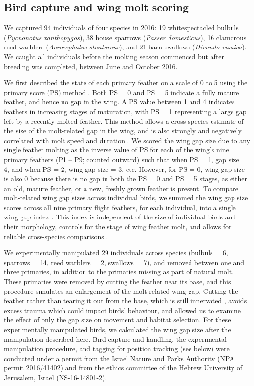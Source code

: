 \begin{refsection}
\subsection*{Bird capture and wing molt scoring}

We captured 94 individuals of four species in 2016: 19 whitespectacled bulbuls (\textit{Pycnonotus xanthopygos}), 38 house sparrows (\textit{Passer domesticus}), 16 clamorous reed warblers (\textit{Acrocephalus stentoreus}), and 21 barn swallows (\textit{Hirundo rustica}).
We caught all individuals before the molting season commenced but after breeding was completed, between June and October 2016.

We first described the state of each primary feather on a scale of 0 to 5 using the primary score (PS) method \citep{ginn1983}.
Both PS = 0 and PS = 5 indicate a fully mature feather, and hence no gap in the wing.
A PS value between 1 and 4 indicates feathers in increasing stages of maturation, with PS = 1 representing a large gap left by a recently molted feather.
This method allows a cross-species estimate of the size of the molt-related gap in the wing, and is also strongly and negatively correlated with molt speed and duration \citep{rohwer2009}.
We scored the wing gap size due to any single feather molting as the inverse value of PS for each of the wing's nine primary feathers (P1 -- P9; counted outward) such that when PS = 1, gap size = 4, and when PS = 2, wing gap size = 3, etc.
However, for PS = 0, wing gap size is also 0 because there is no gap in both the PS = 0 and PS = 5 stages, as either an old, mature feather, or a new, freshly grown feather is present.
To compare molt-related wing gap sizes across individual birds, we summed the wing gap size scores across all nine primary flight feathers, for each individual, into a single wing gap index \citep{kiat2016}.
This index is independent of the size of individual birds and their morphology, controls for the stage of wing feather molt, and allows for reliable cross-species comparisons \citep{bensch1993,kiat2016}.

We experimentally manipulated 29 individuals across species {(bulbuls = 6, sparrows = 14, reed warblers = 2, swallows = 7)}, and removed between one and three primaries, in addition to the primaries missing as part of natural molt.
These primaries were removed by cutting the feather near its base, and this procedure simulates an enlargement of the molt-related wing gap.
Cutting the feather rather than tearing it out from the base, which is still innervated \cite{jenni2020}, avoids excess trauma which could impact birds' behaviour, and allowed us to examine the effect of only the gap size on movement and habitat selection.
For these experimentally manipulated birds, we calculated the wing gap size after the manipulation described here.
Bird capture and handling, the experimental manipulation procedure, and tagging for position tracking (see below) were conducted under a permit from the Israel Nature and Parks Authority (NPA permit 2016/41402) and from the ethics committee of the Hebrew University of Jerusalem, Israel (NS-16-14801-2).


\end{refsection}
